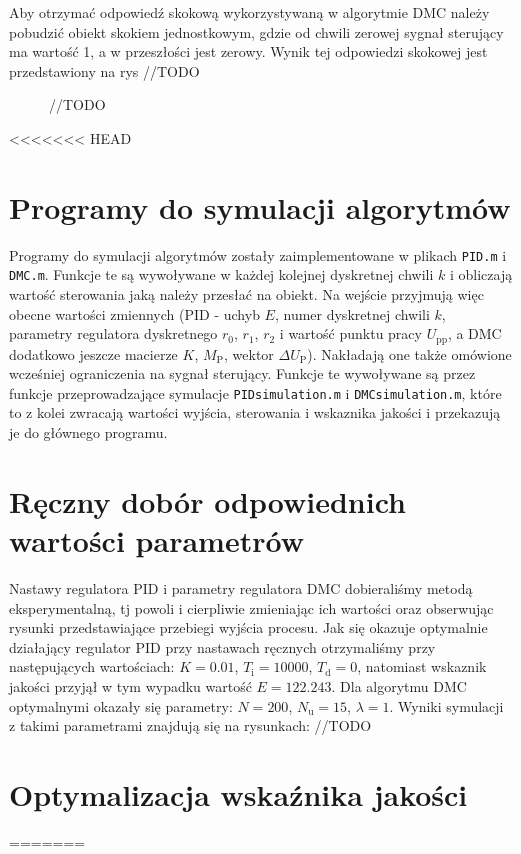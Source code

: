 Aby otrzymać odpowiedź skokową wykorzystywaną w algorytmie DMC należy pobudzić obiekt skokiem jednostkowym, gdzie od chwili zerowej sygnał sterujący ma wartość 1, a w przeszłości jest zerowy. Wynik tej odpowiedzi skokowej jest przedstawiony na rys //TODO
\begin{figure}
	//TODO
\end{figure}
<<<<<<< HEAD

\section{Programy do symulacji algorytmów}
Programy do symulacji algorytmów zostały zaimplementowane w plikach \texttt{PID.m} i \texttt{DMC.m}. Funkcje te są wywoływane w każdej kolejnej dyskretnej chwili $k$ i obliczają wartość sterowania jaką należy przesłać na obiekt. Na wejście przyjmują więc obecne wartości zmiennych (PID - uchyb $E$, numer dyskretnej chwili $k$, parametry regulatora dyskretnego $r_{\mathrm{0}}$, $r_{\mathrm{1}}$, $r_{\mathrm{2}}$ i wartość punktu pracy $U_{\mathrm{pp}}$, a DMC dodatkowo jeszcze macierze $K$, $M_{\mathrm{P}}$, wektor $\Delta U_{\mathrm{P}}$). Nakładają one także omówione wcześniej ograniczenia na sygnał sterujący. Funkcje te wywoływane są przez funkcje przeprowadzające symulacje \texttt{PIDsimulation.m} i \texttt{DMCsimulation.m}, które to z kolei zwracają wartości wyjścia, sterowania i wskaznika jakości i przekazują je do głównego programu.

\section{Ręczny dobór odpowiednich wartości parametrów}
Nastawy regulatora PID i parametry regulatora DMC dobieraliśmy metodą eksperymentalną, tj powoli i cierpliwie zmieniając ich wartości oraz obserwując rysunki przedstawiające przebiegi wyjścia procesu. Jak się okazuje optymalnie działający regulator PID przy nastawach ręcznych otrzymaliśmy przy następujących wartościach: $K=\num{0.01}$, $T_\mathrm{i}=10000$, $T_\mathrm{d}=0$, natomiast wskaznik jakości przyjął w tym wypadku wartość $E=\num{122.243}$. Dla algorytmu DMC optymalnymi okazały się parametry: $N=200$, $N_\mathrm{u}=15$, $\lambda=1$. Wyniki symulacji z takimi parametrami znajdują się na rysunkach: //TODO
\section{Optymalizacja wskaźnika jakości}
=======

